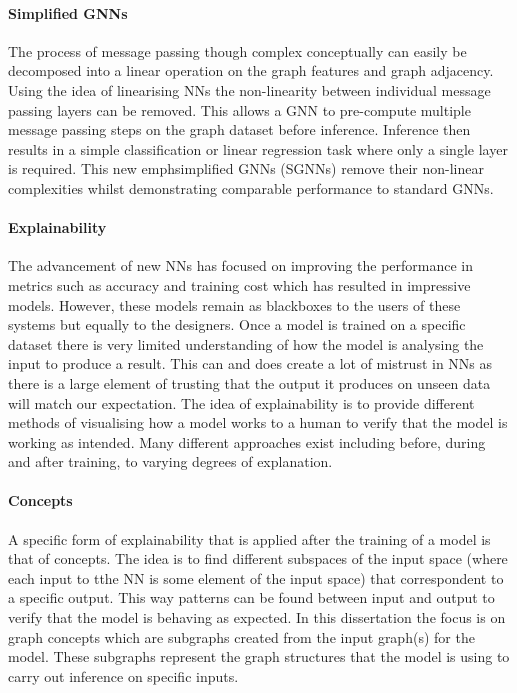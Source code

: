 \paragraph{Simplified GNNs}
The process of message passing though complex conceptually can easily be decomposed into a linear operation on the graph features and graph adjacency.
Using the idea of linearising NNs the non-linearity between individual message passing layers can be removed.
This allows a GNN to pre-compute multiple message passing steps on the graph dataset before inference.
Inference then results in a simple classification or linear regression task where only a single layer is required.
This new emph{simplified GNNs} (SGNNs) remove their non-linear complexities whilst demonstrating comparable performance to standard GNNs.

\paragraph{Explainability}
The advancement of new NNs has focused on improving the performance in metrics such as accuracy and training cost which has resulted in impressive models.
However, these models remain as blackboxes to the users of these systems but equally to the designers.
Once a model is trained on a specific dataset there is very limited understanding of how the model is analysing the input to produce a result.
This can and does create a lot of mistrust in NNs as there is a large element of trusting that the output it produces on unseen data will match our expectation.
The idea of explainability is to provide different methods of visualising how a model works to a human to verify that the model is working as intended.
Many different approaches exist including before, during and after training, to varying degrees of explanation.




\paragraph{Concepts}
A specific form of explainability that is applied after the training of a model  is that of concepts.
The idea is to find different subspaces of the input space (where each input to tthe NN is some element of the input space) that correspondent to a specific output.
This way patterns can be found between input and output to verify that the model is behaving as expected.
In this dissertation the focus is on graph concepts which are subgraphs created from the input graph(s) for the model.
These subgraphs represent the graph structures that the model is using to carry out inference on specific inputs.

